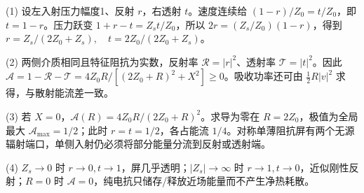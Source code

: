 (1) 设左入射压力幅度1、反射 \(r\)，右透射 \(t\)。速度连续给 \((1-r)/Z_0=t/Z_0\)，即 \(t=1-r\)。压力跃变 \(1+r-t=Z_s t/Z_0\)，所以 \(2r=(Z_s/Z_0)(1-r)\)，得到 \(\boxed{r=Z_s/(2Z_0+Z_s),\quad t=2Z_0/(2Z_0+Z_s)}\)。

(2) 两侧介质相同且特征阻抗为实数，反射率 \(\mathcal R=|r|^2\)、透射率 \(\mathcal T=|t|^2\)。因此 \(\mathcal A=1-\mathcal R-\mathcal T=4Z_0R/[(2Z_0+R)^2+X^2]\ge0\)。吸收功率还可由 \(\frac12 R|v|^2\) 求得，与散射能流差一致。

(3) 若 \(X=0\)，\(\mathcal A(R)=4Z_0R/(2Z_0+R)^2\)。求导为零在 \(R=2Z_0\)，极值为全局最大 \(\mathcal A_{\max}=1/2\)；此时 \(r=t=1/2\)，各占能流 \(1/4\)。对称单薄阻抗屏有两个无源辐射端口，单侧入射仍必须将部分能量分流到反射或透射端。

(4) \(Z_s\to0\) 时 \(r\to0,t\to1\)，屏几乎透明；\(|Z_s|\to\infty\) 时 \(r\to1,t\to0\)，近似刚性反射；\(R=0\) 时 \(\mathcal A=0\)，纯电抗只储存/释放近场能量而不产生净热耗散。
